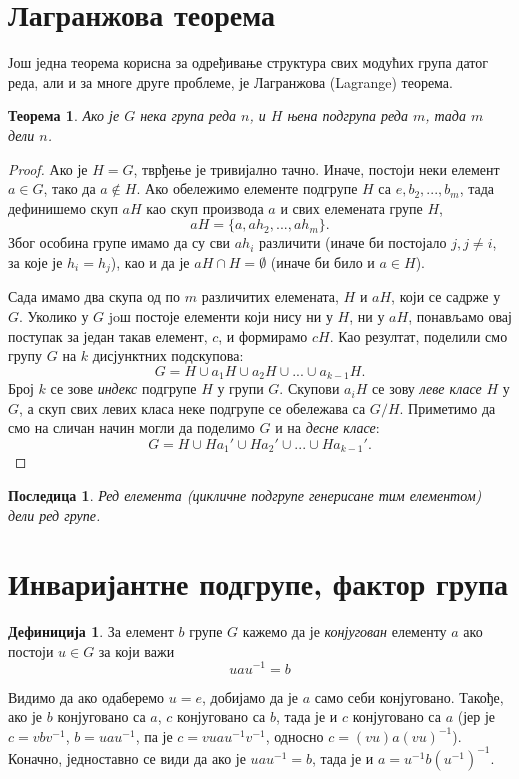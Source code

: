 \documentclass{report}
\theoremstyle{plain}
\newtheorem{thm}{Теорема}
\newtheorem*{cor}{Последица}
\theoremstyle{definition}
\newtheorem*{defn}{Дефиниција}
\begin{document}
\section{Лагранжова теорема}
Још једна теорема корисна за одређивање структура свих модућих група датог реда, али и за многе друге проблеме, је Лагранжова (Lagrange) теорема.
\begin{thm}
Ако је $G$ нека група реда $n$, и $H$ њена подгрупа реда $m$, тада $m$ дели $n$.
\end{thm}
\begin{proof}
Ако је $H=G$, тврђење је тривијално тачно. Иначе, постоји неки елемент $a\in G$, тако да $a\notin H$. Ако обележимо елементе подгрупе $H$ са $e, b_2, ..., b_m$, тада дефинишемо скуп $aH$ као скуп производа $a$ и свих елемената групе $H$,
$$aH = \{a, ah_2, ..., ah_m\}.$$
Због особина групе имамо да су сви $ah_i$ различити (иначе би постојало $j, j\neq i$, за које је $h_i=h_j$), као и да је $aH\cap H = \emptyset$ (иначе би било и $a\in H$).

Сада имамо два скупа од по $m$ различитих елемената, $H$ и $aH$, који се садрже у $G$. Уколико у $G$ joш постоје елементи који нису ни у $H$, ни у $aH$, понављамо овај поступак за један такав елемент, $c$, и формирамо $cH$. Као резултат, поделили смо групу $G$ на $k$ дисјунктних подскупова:
$$G = H \cup a_1 H \cup a_2 H \cup ... \cup a_{k-1} H.$$
Број $k$ се зове \emph{индекс} подгрупе $H$ у групи $G$. Скупови $a_i H$ се зову \emph{леве класе} $H$ у $G$, а скуп свих левих класа неке подгрупе се обележава са $G/H$. Приметимо да смо на сличан начин могли да поделимо $G$ и на \emph{десне класе}:
$$G = H \cup Ha_1'  \cup Ha_2' \cup ... \cup Ha_{k-1}'.$$
\end{proof}
\begin{cor}
Ред елемента (цикличне подгрупе генерисане тим елементом) дели ред групе.
\end{cor}

\section{Инваријантне подгрупе, фактор група}
\begin{defn}
За елемент $b$ групе $G$ кажемо да је \emph{конјугован} елементу $a$ ако постоји $u\in G$ за који важи
$$u a u^{-1} = b$$
\end{defn}
Видимо да ако одаберемо $u = e$, добијамо да је $a$ само себи конјуговано. Такође, ако је $b$ конјуговано са $a$, $c$ конјуговано са $b$, тада је и $c$ конјуговано са $a$ (јер је $c = vbv^{-1}$, $b = uau^{-1}$, па је $c = vuau^{-1}v^{-1}$, односно $c = (vu)a(vu)^{-1}$). Коначно, једноставно се види да ако је $u a u^{-1} = b$, тада је и $a = u^{-1} b (u^{-1})^{-1}$.
\end{document}
